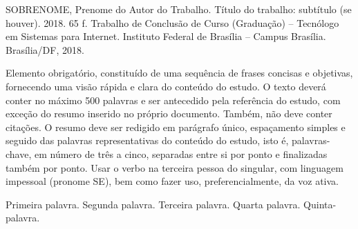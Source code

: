 SOBRENOME, Prenome do Autor do Trabalho. Título do trabalho: subtítulo (se houver).  2018. 65 f. 
Trabalho de Conclusão de Curso (Graduação) – Tecnólogo em Sistemas para Internet. 
Instituto Federal de Brasília – Campus Brasília. Brasília/DF, 2018.
\vspace{1cm}

Elemento obrigatório, constituído de uma sequência de frases concisas e objetivas,
fornecendo uma visão rápida e clara do conteúdo do estudo. O texto deverá conter no
máximo 500 palavras e ser antecedido pela referência do estudo, com exceção do resumo
inserido no próprio documento. Também, não deve conter citações. O resumo deve ser redigido
em parágrafo único, espaçamento simples e seguido das palavras representativas do conteúdo
do estudo, isto é, palavras-chave, em número de três a cinco, separadas entre si por ponto e
finalizadas também por ponto. Usar o verbo na terceira pessoa do singular, com linguagem
impessoal (pronome SE), bem como fazer uso, preferencialmente, da voz ativa.

\begin{keywords}
Primeira palavra. Segunda palavra. Terceira palavra. Quarta palavra. Quinta-palavra.
\end{keywords}
